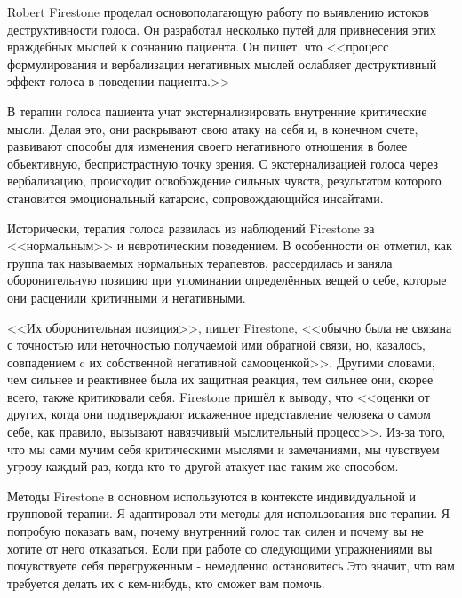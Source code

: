 \documentclass[10pt, fleqn]{article}
\begin{document}

Robert Firestone проделал основополагающую работу по выявлению истоков деструктивности голоса. Он разработал несколько путей для привнесения этих враждебных мыслей к сознанию пациента. Он пишет, что <<процесс формулирования и вербализации негативных мыслей ослабляет деструктивный эффект голоса в поведении пациента.>>

В терапии голоса пациента учат экстернализировать внутренние критические мысли. Делая это, они раскрывают свою атаку на себя и, в конечном счете, развивают способы для изменения своего негативного отношения в более объективную, беспристрастную точку зрения. С экстернализацией голоса через вербализацию, происходит освобождение сильных чувств, результатом которого становится эмоциональный катарсис, сопровождающийся инсайтами.

Исторически, терапия голоса развилась из наблюдений Firestone за <<нормальным>> и невротическим поведением. В особенности он отметил, как группа так называемых нормальных терапевтов, рассердилась и заняла оборонительную позицию при упоминании определённых вещей о себе, которые они расценили критичными и негативными.

<<Их оборонительная позиция>>, пишет Firestone, <<обычно была не связана с точностью или неточностью получаемой ими обратной связи, но, казалось, совпадением c их собственной негативной самооценкой>>. Другими словами, чем сильнее и реактивнее была их защитная реакция, тем сильнее они, скорее всего, также критиковали себя. Firestone пришёл к выводу, что <<оценки от других, когда они подтверждают искаженное представление человека о самом себе, как правило, вызывают навязчивый мыслительный процесс>>. Из-за того, что мы сами мучим себя критическими мыслями и замечаниями, мы чувствуем угрозу каждый раз, когда кто-то другой атакует нас таким же способом.


Методы Firestone в основном используются в контексте индивидуальной и групповой терапии. Я адаптировал эти методы для использования вне терапии. Я попробую показать вам, почему внутренний голос так силен и почему вы не хотите от него отказаться. Если при работе со следующими упражнениями вы почувствуете себя перегруженным - немедленно остановитесь Это значит, что вам требуется делать их с кем-нибудь, кто сможет вам помочь.

\end{document}
